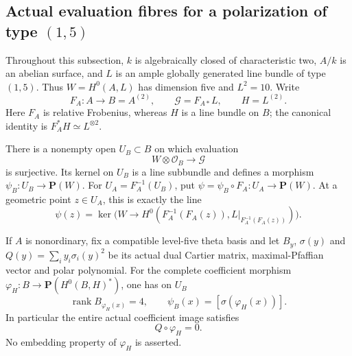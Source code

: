 \subsection{Actual evaluation fibres for a polarization of type \((1,5)\)}

Throughout this subsection, \(k\) is algebraically closed of
characteristic two, \(A/k\) is an abelian surface, and \(L\) is
an ample globally generated line bundle of type \((1,5)\).
Thus \(W=H^0(A,L)\) has dimension five and \(L^2=10\).
Write
\[
 F_A:A\longrightarrow B=A^{(2)},\qquad
 \mathcal G=F_{A*}L,\qquad H=L^{(2)}.
 \tag{EF5.1}
\]
Here \(F_A\) is relative Frobenius, whereas \(H\) is a line
bundle on \(B\); the canonical identity is
\(F_A^*H\simeq L^{\otimes2}\).

\begin{lemma}
\label{lem:DE-five-evaluation-kernel}
There is a nonempty open \(U_B\subset B\) on which evaluation
\[
              W\otimes\mathcal O_B\longrightarrow\mathcal G
                                                        \tag{EF5.2}
\]
is surjective. Its kernel on \(U_B\) is a line subbundle and
defines a morphism \(\psi_B:U_B\to\mathbf P(W)\).
For \(U_A=F_A^{-1}(U_B)\), put
\(\psi=\psi_B\circ F_A:U_A\to\mathbf P(W)\).
At a geometric point \(z\in U_A\), this is exactly the line
\[
 \psi(z)=\ker\bigl(W\longrightarrow
          H^0(F_A^{-1}(F_A(z)),L|_{F_A^{-1}(F_A(z))})\bigr).
 \tag{EF5.3}
\]

If \(A\) is nonordinary, fix a compatible level-five theta
basis and let \(B_y\), \(\sigma(y)\) and
\(Q(y)=\sum_i y_i\sigma_i(y)^2\) be its actual dual Cartier
matrix, maximal-Pfaffian vector and polar polynomial. For the
complete coefficient morphism
\(\varphi_H:B\to\mathbf P(H^0(B,H)^*)\), one has on \(U_B\)
\[
 \operatorname{rank}B_{\varphi_H(x)}=4,
 \qquad \psi_B(x)=[\sigma(\varphi_H(x))].
 \tag{EF5.4}
\]
In particular the entire actual coefficient image satisfies
\[
                     Q\circ\varphi_H=0.
 \tag{EF5.5}
\]
No embedding property of \(\varphi_H\) is asserted.
\end{lemma}
